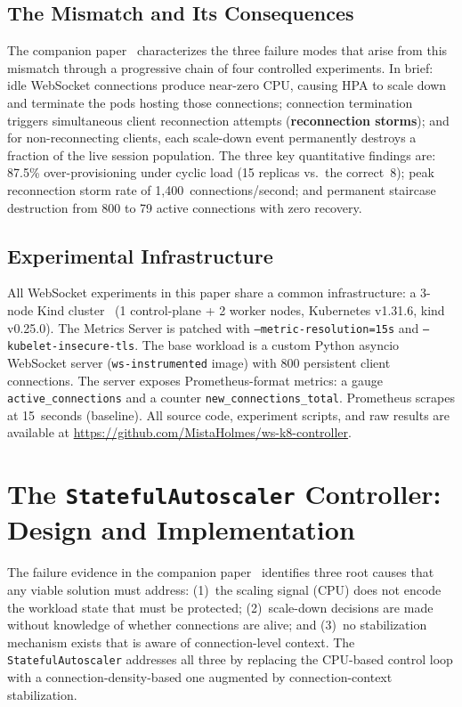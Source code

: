 \documentclass[twocolumn]{svjour3}
\begin{document}
\subsection{The Mismatch and Its Consequences}

The companion paper~\cite{behera2026hpa} characterizes the three failure modes that arise
from this mismatch through a progressive chain of four controlled experiments. In brief: idle
WebSocket connections produce near-zero CPU, causing HPA to scale down and terminate the
pods hosting those connections; connection termination triggers simultaneous client reconnection
attempts (\textbf{reconnection storms}); and for non-reconnecting clients, each scale-down event
permanently destroys a fraction of the live session population. The three key quantitative
findings are: 87.5\% over-provisioning under cyclic load (15 replicas vs.\ the correct~8);
peak reconnection storm rate of 1,400~connections/second; and permanent staircase
destruction from 800 to 79 active connections with zero recovery.

\subsection{Experimental Infrastructure}

All WebSocket experiments in this paper share a common infrastructure: a 3-node Kind
cluster~\cite{kind_docs} (1 control-plane + 2 worker nodes, Kubernetes v1.31.6, kind v0.25.0).
The Metrics Server is patched with \texttt{--metric-resolution=15s} and
\texttt{--kubelet-insecure-tls}. The base workload is a custom Python asyncio WebSocket
server (\texttt{ws-instrumented} image) with 800 persistent client connections. The server
exposes Prometheus-format metrics: a gauge \texttt{active\_connections} and a counter
\texttt{new\_connections\_total}. Prometheus scrapes at 15~seconds (baseline). All source
code, experiment scripts, and raw results are available at
\url{https://github.com/MistaHolmes/ws-k8-controller}.



\section{The \texttt{StatefulAutoscaler} Controller: Design and Implementation}
\label{sec:controller}

The failure evidence in the companion paper~\cite{behera2026hpa} identifies three root causes
that any viable solution must address: (1)~the scaling signal (CPU) does not encode the
workload state that must be protected; (2)~scale-down decisions are made without knowledge
of whether connections are alive; and (3)~no stabilization mechanism exists that is aware of
connection-level context. The \texttt{StatefulAutoscaler} addresses all three by replacing the
CPU-based control loop with a connection-density-based one augmented by
connection-context stabilization.
\end{document}
